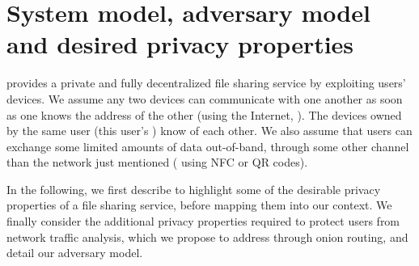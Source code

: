 
\section{System model, adversary model and desired privacy properties}%
\label{system-model}

\name provides a private and fully decentralized file sharing service by exploiting 
users' devices. 
We assume any two devices can communicate with one another as soon as one knows the address of the other (\eg using the Internet, ). The devices owned by the same user (this user's \squad) know of each other.
We also assume that users can exchange some limited amounts of data 
out-of-band, \ie through some other channel than the network just mentioned (\eg 
using \ac{NFC} or QR codes).




In the following, we first describe 
to
highlight some of the desirable privacy properties of a file sharing service, before mapping them into our 
context. 
We finally consider the additional privacy properties required to protect users from  network traffic analysis, which we propose to address through onion
routing, and detail our adversary model.  

